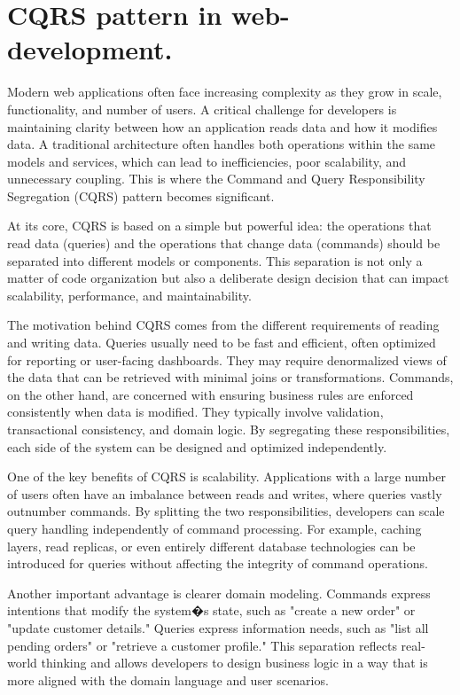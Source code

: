 
\pagebreak

\chapter{CQRS pattern in web-development.}


\medskip

Modern web applications often face increasing complexity as they grow in scale, functionality, and number of users. A critical challenge for developers is maintaining clarity between how an application reads data and how it modifies data. A traditional architecture often handles both operations within the same models and services, which can lead to inefficiencies, poor scalability, and unnecessary coupling. This is where the Command and Query Responsibility Segregation (CQRS) pattern becomes significant.

At its core, CQRS is based on a simple but powerful idea: the operations that read data (queries) and the operations that change data (commands) should be separated into different models or components. This separation is not only a matter of code organization but also a deliberate design decision that can impact scalability, performance, and maintainability.

The motivation behind CQRS comes from the different requirements of reading and writing data. Queries usually need to be fast and efficient, often optimized for reporting or user-facing dashboards. They may require denormalized views of the data that can be retrieved with minimal joins or transformations. Commands, on the other hand, are concerned with ensuring business rules are enforced consistently when data is modified. They typically involve validation, transactional consistency, and domain logic. By segregating these responsibilities, each side of the system can be designed and optimized independently.

One of the key benefits of CQRS is scalability. Applications with a large number of users often have an imbalance between reads and writes, where queries vastly outnumber commands. By splitting the two responsibilities, developers can scale query handling independently of command processing. For example, caching layers, read replicas, or even entirely different database technologies can be introduced for queries without affecting the integrity of command operations.

Another important advantage is clearer domain modeling. Commands express intentions that modify the system�s state, such as "create a new order" or "update customer details." Queries express information needs, such as "list all pending orders" or "retrieve a customer profile." This separation reflects real-world thinking and allows developers to design business logic in a way that is more aligned with the domain language and user scenarios.

